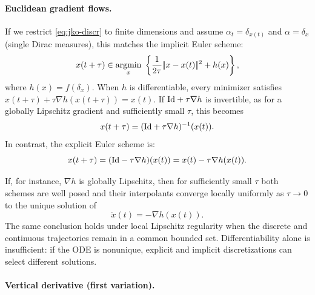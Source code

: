 \paragraph{Euclidean gradient flows.}

If we restrict \eqref{eq:jko-discr} to finite dimensions and assume $\alpha_t = \delta_{x(t)}$ and $\alpha = \delta_x$ (single Dirac measures), this matches the implicit Euler scheme:
\begin{equation*}
    x(t+\tau) \in \underset{x}{\operatorname{argmin}}\;\left\{\frac{1}{2 \tau} |\!| x - x(t) |\!|^2 + h(x)\right\},
\end{equation*}
where $h(x) = f(\delta_x)$. When $h$ is differentiable, every minimizer satisfies $x(t+\tau)+\tau\nabla h(x(t+\tau))=x(t)$. If $\mathrm{Id}+\tau\nabla h$ is invertible, as for a globally Lipschitz gradient and sufficiently small $\tau$, this becomes
\begin{equation*}
    x(t+\tau) = (\mathrm{Id} + \tau \nabla h)^{-1}(x(t)).
\end{equation*}
In contrast, the explicit Euler scheme is:
\begin{equation*}
    x(t+\tau) = (\mathrm{Id} - \tau \nabla h)(x(t)) = x(t) - \tau \nabla h(x(t)).
\end{equation*}

If, for instance, $\nabla h$ is globally Lipschitz, then for sufficiently small $\tau$ both schemes are well posed and their interpolants converge locally uniformly as $\tau\to0$ to the unique solution of
\begin{equation}
    \dot{x}(t) = -\nabla h(x(t)). \label{eq:grad-flow-classical}
\end{equation}
The same conclusion holds under local Lipschitz regularity when the discrete and continuous trajectories remain in a common bounded set. Differentiability alone is insufficient: if the ODE is nonunique, explicit and implicit discretizations can select different solutions.


\paragraph{Vertical derivative (first variation).}

